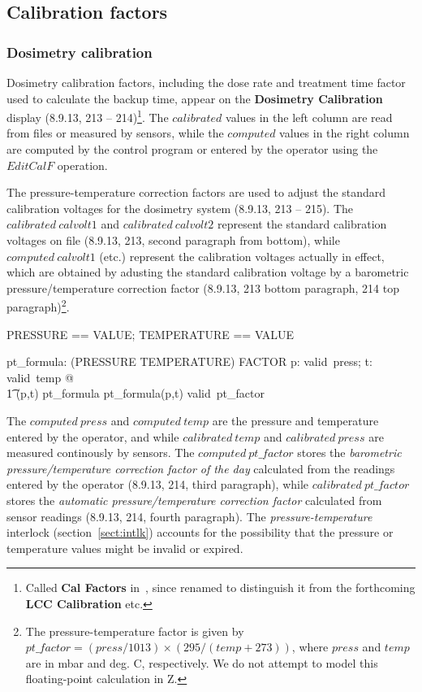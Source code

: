 \subsection{Calibration factors}

\subsubsection{Dosimetry calibration}

Dosimetry calibration factors, including the dose rate and treatment
time factor used to calculate the backup time, appear on the 
{\bf Dosimetry Calibration} display (8.9.13, 213 -- 214)\footnote{Called
{\bf Cal Factors} in~\cite{jacky92}, since renamed to distinguish it
from the forthcoming {\bf LCC Calibration} etc.}.
The $calibrated$ values in the left column are read from
files or measured by sensors, while the $computed$ values in the right
column are computed by the control program or entered by the operator
using the $EditCalF$ operation.

The pressure-temperature correction factors are used to adjust the
standard calibration voltages for the dosimetry system (8.9.13, 213 --
215).  The $calibrated~calvolt1$ and $calibrated~calvolt2$ represent
the standard calibration voltages on file (8.9.13, 213, second
paragraph from bottom), while $computed~calvolt1$ (etc.) represent the
calibration voltages actually in effect, which are obtained by
adusting the standard calibration voltage by a barometric
pressure/temperature correction factor (8.9.13, 213 bottom paragraph,
214 top paragraph)\footnote{The pressure-temperature factor is given
by $pt\_factor = (press/1013) \times (295/(temp+273))$, where $press$
and $temp$ are in mbar and deg. C, respectively. We do not attempt to
model this floating-point calculation in Z.}.

\begin{zed} PRESSURE == VALUE; TEMPERATURE == VALUE \end{zed}

\begin{axdef}
	pt\_formula: (PRESSURE \cross TEMPERATURE) \pfun FACTOR
\where
	\forall p: valid~press; t: valid~temp @ \\
\t1	 (p,t) \in \dom pt\_formula \land pt\_formula(p,t) \in valid~pt\_factor
\end{axdef}
The $computed~press$ and $computed~temp$ are the pressure and
temperature entered by the operator, and while $calibrated~temp$ and
$calibrated~press$ are measured continously by sensors. The
$computed~pt\_factor$ stores the 
{\em barometric pressure/temperature correction factor of the day} 
calculated from the readings entered by
the operator (8.9.13, 214, third paragraph), while
$calibrated~pt\_factor$ stores the 
{\em automatic pressure/temperature correction factor} 
calculated from sensor readings (8.9.13, 214,
fourth paragraph).  The {\em pressure-temperature} interlock
(section~\ref{sect:intlk}) accounts for the possibility that the
pressure or temperature values might be invalid or expired.

